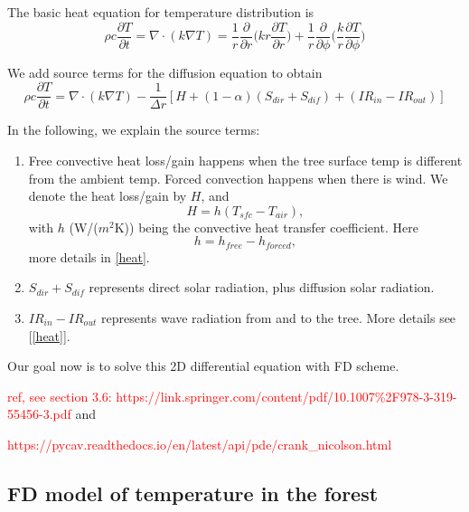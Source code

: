 \documentclass[12pt]{article}
\begin{document}
The basic heat equation for temperature distribution is 
\begin{equation}
\rho c\frac{\partial T}{\partial t}=\nabla\cdot(k\nabla T)=\frac{1}{r}\frac{\partial}{\partial r}\bigg(kr\frac{\partial T}{\partial r}\bigg)+\frac{1}{r}\frac{\partial}{\partial \phi}\bigg(\frac{k}{r}\frac{\partial T}{\partial \phi}\bigg)
\end{equation}

We add source terms for the diffusion equation to obtain
\begin{equation}
\rho c\frac{\partial T}{\partial t}=\nabla\cdot(k\nabla T)-\frac{1}{\Delta r}[H+(1-\alpha)(S_{dir}+S_{dif})+(IR_{in}-IR_{out})]
\end{equation}

In the following, we explain the source terms: 
\begin{enumerate}
\item 
Free convective heat loss/gain happens when the tree surface temp is different from the ambient temp. Forced convection happens when there is wind. We denote the heat loss/gain by $H$, and 
\begin{equation}
H=h(T_{sfc}-T_{air}),
\end{equation}
with $h$ (W/($m^2$K)) being the convective heat transfer coefficient. Here
\begin{equation}
h=h_{free}-h_{forced},
\end{equation}
more details in \ref{heat}. 

\item $S_{dir}+S_{dif}$ represents direct solar radiation, plus diffusion solar radiation. 

\item $IR_{in}-IR_{out}$ represents wave radiation from and to the tree. More details see [\ref{heat}].

\end{enumerate}

Our goal now is to solve this 2D differential equation with FD scheme.

\textcolor{red}{ref, see section 3.6: https://link.springer.com/content/pdf/10.1007\%2F978-3-319-55456-3.pdf} and

\textcolor{red}{https://pycav.readthedocs.io/en/latest/api/pde/crank\_nicolson.html}

\subsection{FD model of temperature in the forest}
\end{document}
